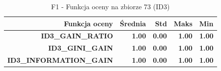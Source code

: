 \begin{table}[htbp]
\centering
\small
\setlength{\tabcolsep}{6pt}
\renewcommand{\arraystretch}{1.2}
\caption{F1 - Funkcja oceny na zbiorze 73 (ID3)}
\label{tab:ID3_eval_function_73_f1}
\begin{tabular}{r|r|r|r|r}
\toprule
Funkcja oceny & Średnia & Std & Maks & Min \\
\hline
\textbf{ID3\_GAIN\_RATIO} & \textbf{1.00} & \textbf{0.00} & \textbf{1.00} & \textbf{1.00} \\
\textbf{ID3\_GINI\_GAIN} & \textbf{1.00} & \textbf{0.00} & \textbf{1.00} & \textbf{1.00} \\
\textbf{ID3\_INFORMATION\_GAIN} & \textbf{1.00} & \textbf{0.00} & \textbf{1.00} & \textbf{1.00} \\
\bottomrule
\end{tabular}
\end{table}
